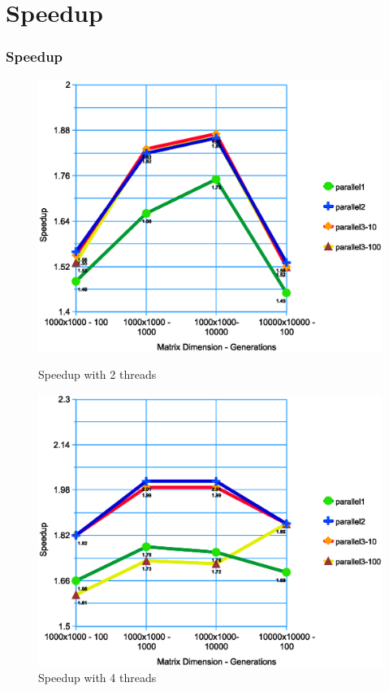 \documentclass{beamer}
\begin{document}
\section{Speedup}
\begin{frame}
	\frametitle{Speedup}

	\begin{figure}
		\centering
		\begin{minipage}{0.5\textwidth}
			\centering
			\includegraphics[width=\linewidth]{../report/2.eps}
			\caption{Speedup with 2 threads}
		\end{minipage}%
		\begin{minipage}{0.5\textwidth}
			\centering
			\includegraphics[width=\linewidth]{../report/4.eps}
			\caption{Speedup with 4 threads}
		\end{minipage}
	\end{figure}
\end{frame}
\end{document}
